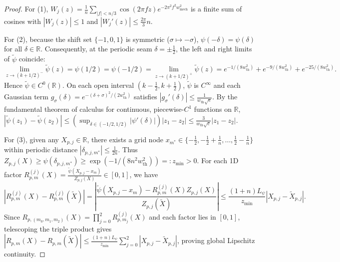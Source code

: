 \documentclass[11pt,a4paper]{article}
\theoremstyle{definition}
\begin{document}
\begin{proof}
For (1), $W_j(z) = \frac{1}{n}\sum_{|f|<n/3} \cos(2\pi f z)e^{-2\pi^2 f^2 w_{\mathrm{mech}}^2}$ is a finite sum of cosines with $|W_j(z)| \le 1$ and $|W_j'(z)| \le \frac{2\pi}{3}n$.

For (2), because the shift set $\{-1, 0, 1\}$ is symmetric ($\sigma \mapsto -\sigma$), $\psi(-\delta) = \psi(\delta)$ for all $\delta \in \mathbb{R}$. Consequently, at the periodic seam $\delta = \pm \frac{1}{2}$, the left and right limits of $\widetilde{\psi}$ coincide:
\begin{equation}
  \lim_{z \to (k + 1/2)^-} \widetilde{\psi}(z) = \psi(1/2) = \psi(-1/2) = \lim_{z \to (k + 1/2)^+} \widetilde{\psi}(z)
  = e^{-1/(8 w_{\mathrm{th}}^2)} + e^{-9/(8 w_{\mathrm{th}}^2)} + e^{-25/(8 w_{\mathrm{th}}^2)}.
\end{equation}
Hence $\widetilde{\psi} \in C^0(\mathbb{R})$. On each open interval $(k - \frac{1}{2}, k + \frac{1}{2})$, $\widetilde{\psi}$ is $C^\infty$ and each Gaussian term $g_\sigma(\delta) = e^{-(\delta+\sigma)^2/(2w_{\mathrm{th}}^2)}$ satisfies $|g_\sigma'(\delta)| \le \frac{1}{w_{\mathrm{th}}\sqrt{e}}$. By the fundamental theorem of calculus for continuous, piecewise-$C^1$ functions on $\mathbb{R}$, $|\widetilde{\psi}(z_1) - \widetilde{\psi}(z_2)| \le (\sup_{\delta \in (-1/2, 1/2)} |\psi'(\delta)|)|z_1 - z_2| \le \frac{3}{w_{\mathrm{th}}\sqrt{e}}|z_1 - z_2|$.

For (3), given any $X_{p,j} \in \mathbb{R}$, there exists a grid node $x_{m^*} \in \{-\frac{1}{2}, -\frac{1}{2}+\frac{1}{n}, \dots, \frac{1}{2}-\frac{1}{n}\}$ within periodic distance $|\delta_{p,j,m^*}| \le \frac{1}{2n}$. Thus $Z_{p,j}(X) \ge \psi(\delta_{p,j,m^*}) \ge \exp(-1/(8 n^2 w_{\mathrm{th}}^2)) =: z_{\min} > 0$. For each 1D factor $R^{(j)}_{p,m}(X) = \frac{\widetilde{\psi}(X_{p,j}-x_m)}{Z_{p,j}(X)} \in [0, 1]$, we have
\begin{equation}
  |R^{(j)}_{p,m}(X) - R^{(j)}_{p,m}(\widetilde{X})|
  = \left|\frac{\widetilde{\psi}(X_{p,j}-x_m) - R^{(j)}_{p,m}(X) Z_{p,j}(X)}{Z_{p,j}(\widetilde{X})}\right|
  \le \frac{(1 + n) L_\psi}{z_{\min}} |X_{p,j} - \widetilde{X}_{p,j}|.
\end{equation}
Since $R_{p,(m_0,m_1,m_2)}(X) = \prod_{j=0}^2 R^{(j)}_{p,m_j}(X)$ and each factor lies in $[0, 1]$, telescoping the triple product gives $|R_{p,m}(X) - R_{p,m}(\widetilde{X})| \le \frac{(1+n)L_\psi}{z_{\min}}\sum_{j=0}^2 |X_{p,j} - \widetilde{X}_{p,j}|$, proving global Lipschitz continuity.
\end{proof}
\end{document}
